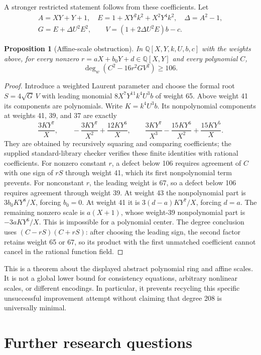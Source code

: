 \documentclass[11pt]{article}
\newtheorem{proposition}[theorem]{Proposition}
\theoremstyle{definition}\newtheorem{definition}[theorem]{Definition}
\theoremstyle{remark}\newtheorem{remark}[theorem]{Remark}
\begin{document}
A stronger restricted statement follows from these coefficients.
Let
\[
 \begin{gathered}
 A=XY+Y+1,\quad E=1+XY^2k^2+X^2Y^4k^2,\quad\Delta=A^2-1,\\
 G=E+\Delta U^2E^2,\qquad V=(1+2\Delta U^2E)b-c.
 \end{gathered}
\]
\begin{proposition}[Affine-scale obstruction]
In $\mathbb Q[X,Y,k,U,b,c]$ with the weights above, for every nonzero
$r=aX+b_0Y+d\in\mathbb Q[X,Y]$ and every polynomial $C$,
\[
 \deg_w(C^2-16r^2GV^2)\geq106.
\]
\end{proposition}
\begin{proof}
Introduce a weighted Laurent parameter and choose the formal root
$S=4\sqrt G\,V$ with leading monomial
$8X^7Y^{11}k^4U^3b$ of weight 65. Above weight 41 its components
are polynomials. Write $K=k^4U^3b$. Its nonpolynomial components
at weights 41, 39, and 37 are exactly
\[
 \frac{3KY^7}{X},\qquad
 -\frac{3KY^7}{X^2}+\frac{12KY^6}{X},\qquad
 \frac{3KY^7}{X^3}-\frac{15KY^6}{X^2}+\frac{15KY^5}{X}.
\]
They are obtained by recursively squaring and comparing coefficients;
the supplied standard-library checker verifies these finite identities
with rational coefficients. For nonzero constant $r$, a defect below
106 requires agreement of $C$ with one sign of $rS$ through weight
41, which its first nonpolynomial term prevents. For nonconstant $r$,
the leading weight is 67, so a defect below 106 requires agreement
through weight 39. At weight 43 the nonpolynomial part is
$3b_0KY^8/X$, forcing $b_0=0$. At weight 41 it is
$3(d-a)KY^7/X$, forcing $d=a$. The remaining nonzero scale is
$a(X+1)$, whose weight-39 nonpolynomial part is $-3aKY^6/X$.
This is impossible for a polynomial center. The degree conclusion
uses $(C-rS)(C+rS)$: after choosing the leading sign, the second
factor retains weight 65 or 67, so its product with the first
unmatched coefficient cannot cancel in the rational function field.
\end{proof}

This is a theorem about the displayed abstract polynomial ring and
affine scales. It is not a global lower bound for consistency equations,
arbitrary nonlinear scales, or different encodings. In particular, it
prevents recycling this specific unsuccessful improvement attempt
without claiming that degree 208 is universally minimal.

\section{Further research questions}
\end{document}
